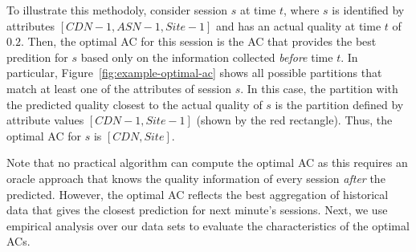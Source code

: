 To illustrate this methodoly, consider session $s$ at time $t$, where
$s$ is identified by attributes $[CDN-1, ASN-1, Site-1]$ and has an
actual quality at time $t$ of $0.2$. Then, the optimal AC for this
session is the AC that provides the best predition for $s$ based only
on the information collected \emph{before} time $t$.  In particular,
Figure~\ref{fig:example-optimal-ac} shows all possible partitions that
match at least one of the attributes of session $s$. In this case, the
partition with the predicted quality closest to the actual quality of
$s$ is the partition defined by attribute values $[CDN-1, Site-1]$
(shown by the red rectangle). Thus, the optimal AC for $s$ is $[CDN,
Site]$.


Note that no practical algorithm can compute the optimal AC as this
requires an oracle approach that knows the quality information of
every session \emph{after} the predicted. However, the optimal AC reflects
the best aggregation of historical data that gives the closest
prediction for next minute's sessions. Next, we use empirical analysis
over our data sets to evaluate the characteristics of the optimal ACs.

